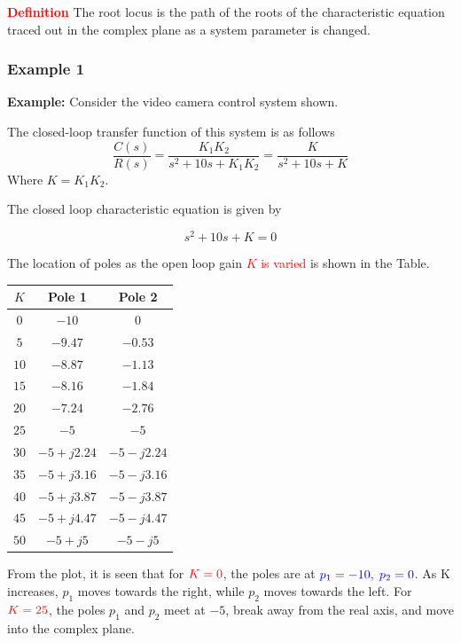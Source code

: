 \documentclass[
  14pt,
  a4paper,
  oneside,
  open=any,
  a4paper,
  14pt]{report}
\begin{document}
\textcolor{red}{\textbf{Definition}} The root locus is the path of the
roots of the characteristic equation traced out in the complex plane as
a system parameter is changed.

\subsubsection{Example 1}\label{example-1-5}

\textbf{Example:} Consider the video camera control system shown.

The closed-loop transfer function of this system is as follows \[
    \dfrac{C(s)}{R(s)} = \dfrac{K_1K_2}{s^2+10s+K_1K_2} = \dfrac{K}{s^2+10s+K}
\] Where \(K = K_1K_2\).

The closed loop characteristic equation is given by

\[
    s^2+10s+K = 0
\]

The location of poles as the open loop gain \textcolor{red}{\(K\) is
varied} is shown in the Table.

\begin{longtable}[]{@{}ccc@{}}
\toprule\noalign{}
\(K\) & Pole 1 & Pole 2 \\
\midrule\noalign{}
\endhead
\bottomrule\noalign{}
\endlastfoot
\(0\) & \(-10\) & \(0\) \\
\(5\) & \(-9.47\) & \(-0.53\) \\
\(10\) & \(-8.87\) & \(-1.13\) \\
\(15\) & \(-8.16\) & \(-1.84\) \\
\(20\) & \(-7.24\) & \(-2.76\) \\
\(25\) & \(-5\) & \(-5\) \\
\(30\) & \(-5+j2.24\) & \(-5-j2.24\) \\
\(35\) & \(-5+j3.16\) & \(-5-j3.16\) \\
\(40\) & \(-5+j3.87\) & \(-5-j3.87\) \\
\(45\) & \(-5+j4.47\) & \(-5-j4.47\) \\
\(50\) & \(-5+j5\) & \(-5-j5\) \\
\end{longtable}

From the plot, it is seen that for \(\textcolor{red}{K=0}\), the poles
are at \(\textcolor{blue}{p_1=-10, \; p_2 = 0}\). As K increases,
\(p_1\) moves towards the right, while \(p_2\) moves towards the left.
For \(\textcolor{red}{K=25}\), the poles \(p_1\) and \(p_2\) meet at
\(-5\), break away from the real axis, and move into the complex plane.
\end{document}

